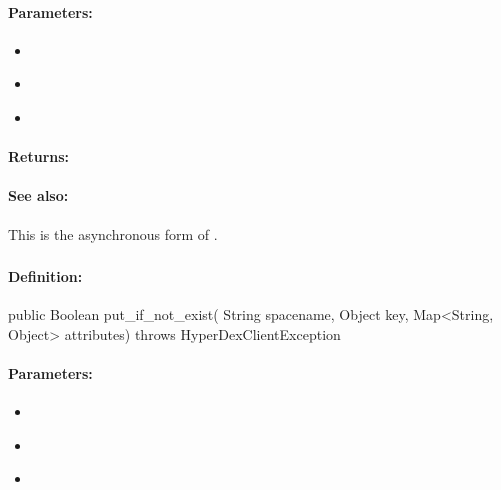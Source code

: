 \paragraph{Parameters:}
\begin{itemize}[noitemsep]
\item {}\\

\item {}\\

\item {}\\

\end{itemize}

\paragraph{Returns:}


\paragraph{See also:}  This is the asynchronous form of .

\pagebreak
\subsubsection{}
\label{api:java:put_if_not_exist}


\paragraph{Definition:}
\begin{javacode}
public Boolean put_if_not_exist(
        String spacename,
        Object key,
        Map<String, Object> attributes) throws HyperDexClientException
\end{javacode}

\paragraph{Parameters:}
\begin{itemize}[noitemsep]
\item {}\\

\item {}\\

\item {}\\

\end{itemize}

